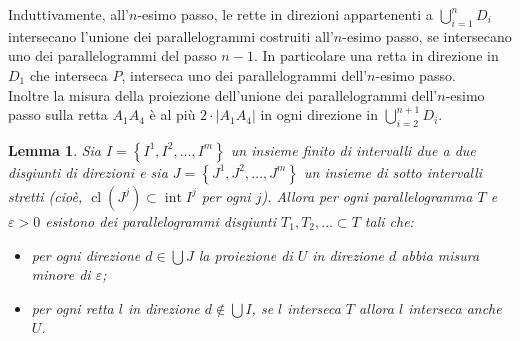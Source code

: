\documentclass[a4paper, twoside,openright]{article}
\newcommand{\<}{\langle}
\renewcommand{\>}{\rangle}
\newtheorem{lemma}[teo]{Lemma}
\begin{document}
Induttivamente, all'$n$-esimo passo, le rette in direzioni appartenenti a $\bigcup_{i=1}^n D_i$ intersecano l'unione dei parallelogrammi costruiti all'$n$-esimo passo, se intersecano uno dei parallelogrammi del passo $n-1$. In particolare una retta in direzione in $D_1$ che interseca $P$, interseca uno dei parallelogrammi dell'$n$-esimo passo.\\
Inoltre la misura della proiezione dell'unione dei parallelogrammi dell'$n$-esimo passo sulla retta $A_{1} A_{4}$ è al più $2 \cdot\left|A_{1} A_{4}\right|$ in ogni direzione in $\bigcup_{i=2}^{n+1}D_i$.\\

\begin{lemma}
	Sia $I=\left\{I^{1}, I^{2}, \ldots, I^{m}\right\}$ un insieme finito di intervalli due a due disgiunti di direzioni e sia $J=\left\{J^{1}, J^{2}, \ldots, J^{m}\right\}$ un insieme di sotto intervalli stretti (cioè, $\operatorname{cl}\left(J^{j}\right) \subset \operatorname{int} I^{j}$ per ogni $j$). Allora per ogni parallelogramma $T$ e $\varepsilon>0$ esistono dei parallelogrammi disgiunti $T_{1}, T_{2}, \ldots \subset T$ tali che:
	
	\begin{itemize}
		\item per ogni direzione $d \in \bigcup J$ la proiezione di $U$ in direzione $d$ abbia misura minore di $\varepsilon$;
		\item per ogni retta $l$ in direzione $d \notin \bigcup I$, se $l$ interseca $T$ allora $l$ interseca anche $U$.	
	\end{itemize}
\end{lemma}	
\end{document}

